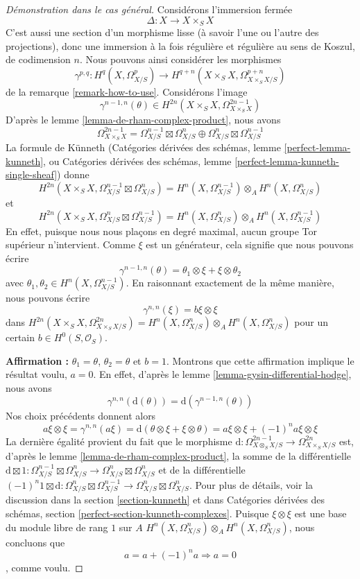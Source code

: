 \begin{proof}[Démonstration dans le cas général]
\medskip\noindent
Considérons l'immersion fermée
$$
\Delta : X \to X \times_S X
$$
C'est aussi une section d'un morphisme lisse (à savoir l'une ou l'autre des projections),
donc une immersion à la fois régulière et régulière au sens de Koszul, de codimension $n$.
Nous pouvons ainsi considérer les morphismes
$$
\gamma^{p, q} :
H^q(X, \Omega^p_{X/S})
\longrightarrow
H^{q + n}(X \times_S X, \Omega^{p + n}_{X \times_S X/S})
$$
de la remarque \ref{remark-how-to-use}. Considérons l'image
$$
\gamma^{n - 1, n}(\theta) \in
H^{2n}(X \times_S X, \Omega^{2n - 1}_{X \times_S X})
$$
D'après le lemme \ref{lemma-de-rham-complex-product}, nous avons
$$
\Omega^{2n - 1}_{X \times_S X} =
\Omega^{n - 1}_{X/S} \boxtimes \Omega^n_{X/S} \oplus
\Omega^n_{X/S} \boxtimes \Omega^{n - 1}_{X/S}
$$
La formule de Künneth (Catégories dérivées des schémas, lemme \ref{perfect-lemma-kunneth}, ou
Catégories dérivées des schémas, lemme \ref{perfect-lemma-kunneth-single-sheaf})
donne
$$
H^{2n}(X \times_S X, \Omega^{n - 1}_{X/S} \boxtimes \Omega^n_{X/S}) =
H^n(X, \Omega^{n - 1}_{X/S}) \otimes_A H^n(X, \Omega^n_{X/S})
$$
et
$$
H^{2n}(X \times_S X, \Omega^n_{X/S} \boxtimes \Omega^{n - 1}_{X/S}) =
H^n(X, \Omega^n_{X/S}) \otimes_A H^n(X, \Omega^{n - 1}_{X/S})
$$
En effet, puisque nous nous plaçons en degré maximal, aucun groupe Tor supérieur
n'intervient. Comme $\xi$ est un générateur, cela signifie
que nous pouvons écrire
$$
\gamma^{n - 1, n}(\theta) = \theta_1 \otimes \xi + \xi \otimes \theta_2
$$
avec $\theta_1, \theta_2 \in H^n(X, \Omega^{n - 1}_{X/S})$.
En raisonnant exactement de la même manière, nous pouvons écrire
$$
\gamma^{n, n}(\xi) = b \xi \otimes \xi
$$
dans
$H^{2n}(X \times_S X, \Omega^{2n}_{X \times_S X/S}) =
H^n(X, \Omega^n_{X/S}) \otimes_A H^n(X, \Omega^n_{X/S})$
pour un certain $b \in H^0(S, \mathcal{O}_S)$.

\medskip\noindent
{\bf Affirmation :} $\theta_1 = \theta$, $\theta_2 = \theta$ et $b = 1$.
Montrons que cette affirmation implique le résultat voulu, $a = 0$.
En effet, d'après le lemme \ref{lemma-gysin-differential-hodge},
nous avons
$$
\gamma^{n, n}(\text{d}(\theta)) = \text{d}(\gamma^{n - 1, n}(\theta))
$$
Nos choix précédents donnent alors
$$
a \xi \otimes \xi =
\gamma^{n, n}(a\xi) =
\text{d}(\theta \otimes \xi + \xi \otimes \theta) =
a \xi \otimes \xi + (-1)^n a \xi \otimes \xi
$$
La dernière égalité provient du fait que le morphisme
$\text{d} : \Omega^{2n - 1}_{X \otimes_S X/S} \to \Omega^{2n}_{X \times_S X/S}$
est, d'après le lemme \ref{lemma-de-rham-complex-product},
la somme de la différentielle
$\text{d} \boxtimes 1 : \Omega^{n - 1}_{X/S} \boxtimes \Omega^n_{X/S}
\to \Omega^n_{X/S} \boxtimes \Omega^n_{X/S}$
et de la différentielle
$(-1)^n 1 \boxtimes \text{d} : \Omega^n_{X/S} \boxtimes \Omega^{n - 1}_{X/S}
\to \Omega^n_{X/S} \boxtimes \Omega^n_{X/S}$. Pour plus de détails, voir la discussion dans
la section \ref{section-kunneth} et dans
Catégories dérivées des schémas, section
\ref{perfect-section-kunneth-complexes}.
Puisque $\xi \otimes \xi$ est une base du module libre de rang $1$ sur $A$
$H^n(X, \Omega^n_{X/S}) \otimes_A H^n(X, \Omega^n_{X/S})$,
nous concluons que
$$
a = a + (-1)^n a \Rightarrow a = 0
$$,
comme voulu.


\end{proof}
